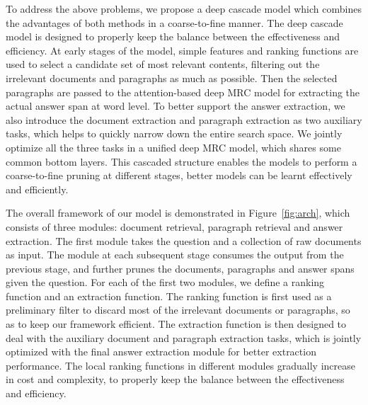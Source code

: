 \documentclass[letterpaper]{article} \usepackage{aaai19}  \usepackage{graphicx}
\begin{document}
To address the above problems, we propose a deep cascade model which combines the advantages of both methods in a coarse-to-fine manner. The deep cascade model is designed to properly keep the balance between the effectiveness and efficiency. At early stages of the model, simple features and ranking functions are used to select a candidate set of most relevant contents, filtering out the irrelevant documents and paragraphs as much as possible. Then the selected paragraphs are passed to the attention-based deep MRC model for extracting the actual answer span at word level. To better support the answer extraction, we also introduce the document extraction and paragraph extraction as two auxiliary tasks, which helps to quickly narrow down the entire search space. We jointly optimize all the three tasks in a unified deep MRC model, which shares some common bottom layers. This cascaded structure enables the models to perform a coarse-to-fine pruning at different stages, better models can be learnt effectively and efficiently.





The overall framework of our model is demonstrated in Figure~\ref{fig:arch}, which consists of three modules: document retrieval, paragraph retrieval and answer extraction. The first  module takes the question and a collection of raw documents as input. The module at each subsequent stage consumes the output from the previous stage, and further prunes the documents, paragraphs and answer spans given the question. For each of the first two modules, we define a ranking function and an extraction function. The ranking function is first used as a preliminary filter to discard  most of the irrelevant documents or paragraphs, so as to keep our framework efficient. The extraction function is then designed to deal with the auxiliary document and paragraph extraction tasks, which is jointly optimized with the final answer extraction module for better extraction performance.  The local ranking functions in different modules gradually increase in cost and complexity, to properly keep the balance between the effectiveness and efficiency.
\end{document}
